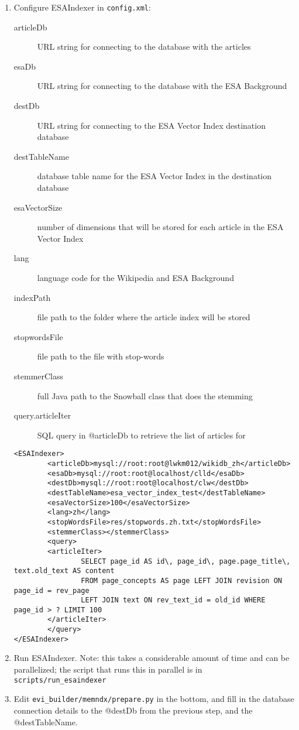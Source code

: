 \documentclass{article}
\begin{document}
\begin{enumerate}
\item Configure ESAIndexer in \verb|config.xml|:
  \begin{description}
    \item[articleDb] URL string for connecting to the database with the articles
  \item[esaDb] URL string for connecting to the database with the ESA Background
  \item[destDb] URL string for connecting to the ESA Vector Index destination database
  \item[destTableName] database table name for the ESA Vector Index in the destination database
  \item[esaVectorSize] number of dimensions that will be stored for each article in the ESA Vector Index
  \item[lang] language code for the Wikipedia and ESA Background
    \item[indexPath] file path to the folder where the article index will be stored
    \item[stopwordsFile] file path to the file with stop-words
    \item[stemmerClass] full Java path to the Snowball class that does the stemming
    \item[query.articleIter] SQL query in @articleDb to retrieve the list of articles for
  \end{description}
\begin{verbatim}
<ESAIndexer>
        <articleDb>mysql://root:root@lwkm012/wikidb_zh</articleDb>
        <esaDb>mysql://root:root@localhost/clld</esaDb>
        <destDb>mysql://root:root@localhost/clw</destDb>
        <destTableName>esa_vector_index_test</destTableName>
        <esaVectorSize>100</esaVectorSize>
        <lang>zh</lang>
        <stopWordsFile>res/stopwords.zh.txt</stopWordsFile>
        <stemmerClass></stemmerClass>
        <query>
        <articleIter>
                SELECT page_id AS id\, page_id\, page.page_title\, text.old_text AS content
                FROM page_concepts AS page LEFT JOIN revision ON page_id = rev_page
                LEFT JOIN text ON rev_text_id = old_id WHERE page_id > ? LIMIT 100
        </articleIter>
        </query>
</ESAIndexer>
\end{verbatim}
\item Run ESAIndexer. Note: this takes a considerable amount of time and can be parallelized; the script that runs this in parallel is in \texttt{scripts/run\_esaindexer}
\item Edit \texttt{evi\_builder/memndx/prepare.py} in the bottom, and fill in the database connection details to the @destDb from the previous step, and the @destTableName.

\end{enumerate}
\end{document}
